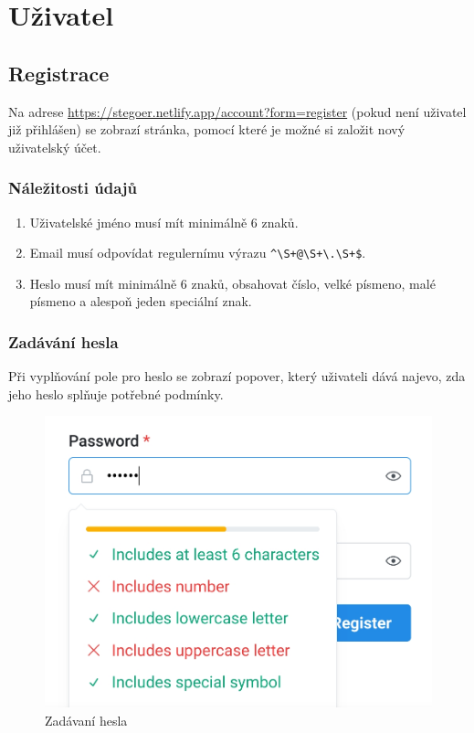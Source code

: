 
\section{Uživatel}\label{sec:uzivatel}

\subsection{Registrace}\label{subsec:registrace}
Na adrese \url{https://stegoer.netlify.app/account?form=register} (pokud není
uživatel již přihlášen) se zobrazí stránka, pomocí které je možné si založit
nový uživatelský účet.

\subsubsection{Náležitosti údajů}\label{subsubsec:naleziosti-udaju}

\begin{enumerate}
    \item Uživatelské jméno musí mít minimálně 6 znaků.
    \item Email musí odpovídat regulernímu výrazu \verb/^\S+@\S+\.\S+$/.
    \item Heslo musí mít minimálně 6 znaků, obsahovat číslo, velké písmeno, malé
    písmeno a alespoň jeden speciální znak.
\end{enumerate}

\subsubsection{Zadávání hesla}\label{subsubsec:zadavani-hesla}

Při vyplňování pole pro heslo se zobrazí popover\cite{enwiki:popover},
který uživateli dává najevo, zda jeho heslo splňuje potřebné podmínky.

\begin{figure}
    \centering
    \includegraphics[scale=0.3]{assets/images/password-popover}
    \caption{Zadávaní hesla}\label{fig:zadavani-hesla}
\end{figure}

